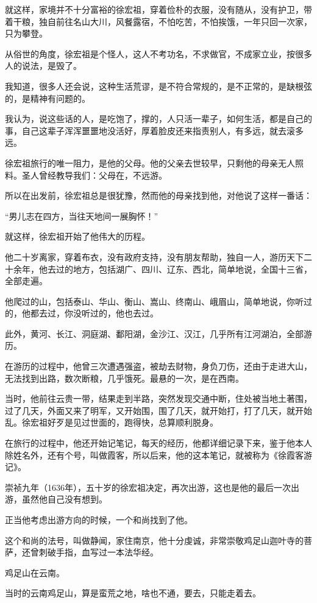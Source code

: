 \begin{multicols}{\theparacolNo}
		就这样，家境并不十分富裕的徐宏祖，穿着俭朴的衣服，没有随从，没有护卫，带着干粮，独自前往名山大川，风餐露宿，不怕吃苦，不怕挨饿，一年只回一次家，只为攀登。

		从俗世的角度，徐宏祖是个怪人，这人不考功名，不求做官，不成家立业，按很多人的说法，是毁了。

		我知道，很多人还会说，这种生活荒谬，是不符合常规的，是不正常的，是缺根弦的，是精神有问题的。

		我认为，说这些话的人，是吃饱了，撑的，人只活一辈子，如何生活，都是自己的事，自己这辈子浑浑噩噩地没活好，厚着脸皮还来指责别人，有多远，就去滚多远。

		徐宏祖旅行的唯一阻力，是他的父母。他的父亲去世较早，只剩他的母亲无人照料。圣人曾经教导我们：父母在，不远游。

		所以在出发前，徐宏祖总是很犹豫，然而他的母亲找到他，对他说了这样一番话：

		“男儿志在四方，当往天地间一展胸怀！”

		就这样，徐宏祖开始了他伟大的历程。

		他二十岁离家，穿着布衣，没有政府支持，没有朋友帮助，独自一人，游历天下二十余年，他去过的地方，包括湖广、四川、辽东、西北，简单地说，全国十三省，全部走遍。

		他爬过的山，包括泰山、华山、衡山、嵩山、终南山、峨眉山，简单地说，你听过的，他都去过，你没听过的，他也去过。

		此外，黄河、长江、洞庭湖、鄱阳湖，金沙江、汉江，几乎所有江河湖泊，全部游历。

		在游历的过程中，他曾三次遭遇强盗，被劫去财物，身负刀伤，还由于走进大山，无法找到出路，数次断粮，几乎饿死。最悬的一次，是在西南。

		当时，他前往云贵一带，结果走到半路，突然发现交通中断，住处被当地土著围，过了几天，外面又来了明军，又开始围，围了几天，就开始打，打了几天，就开始乱。徐宏祖好歹是见过世面的，跑得快，总算顺利脱身。

		在旅行的过程中，他还开始记笔记，每天的经历，他都详细记录下来，鉴于他本人除姓名外，还有个号，叫做霞客，所以后来，他的这本笔记，就被称为《徐霞客游记》。

		崇祯九年（1636年），五十岁的徐宏祖决定，再次出游，这也是他的最后一次出游，虽然他自己没有想到。

		正当他考虑出游方向的时候，一个和尚找到了他。

		这个和尚的法号，叫做静闻，家住南京，他十分虔诚，非常崇敬鸡足山迦叶寺的菩萨，还曾刺破手指，血写过一本法华经。

		鸡足山在云南。

		当时的云南鸡足山，算是蛮荒之地，啥也不通，要去，只能走着去。


\end{multicols}

